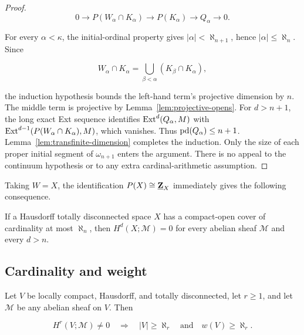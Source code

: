 \begin{proof}
\[
0\longrightarrow P(W_\alpha\cap K_\alpha)
\longrightarrow P(K_\alpha)
\longrightarrow Q_\alpha\longrightarrow0.
\]

For every \(\alpha<\kappa\), the initial-ordinal property gives
\(|\alpha|<\aleph_{n+1}\), hence \(|\alpha|\leq\aleph_n\). Since

\[
W_\alpha\cap K_\alpha
=\bigcup_{\beta<\alpha}(K_\beta\cap K_\alpha),
\]

the induction hypothesis bounds the left-hand term's projective dimension
by \(n\). The middle term is projective by
Lemma~\ref{lem:projective-opens}. For \(d>n+1\), the long exact Ext
sequence identifies \(\operatorname{Ext}^d(Q_\alpha,M)\) with
\(\operatorname{Ext}^{d-1}(P(W_\alpha\cap K_\alpha),M)\), which vanishes.
Thus \(\operatorname{pd}(Q_\alpha)\leq n+1\).
Lemma~\ref{lem:transfinite-dimension} completes the induction.
Only the size of each proper initial segment of \(\omega_{n+1}\) enters
the argument. There is no appeal to the continuum hypothesis or to any
extra cardinal-arithmetic assumption.
\end{proof}

Taking \(W=X\), the identification \(P(X)\cong\underline{\mathbf Z}_X\)
immediately gives the following consequence.

\begin{corollary}\label{cor:cover-vanishing}
If a Hausdorff totally disconnected space \(X\) has a compact-open cover
of cardinality at most \(\aleph_n\), then
\(H^d(X;\mathcal M)=0\) for every abelian sheaf \(\mathcal M\) and
every \(d>n\).
\end{corollary}

\subsection{Cardinality and weight}

\begin{corollary}\label{cor:universal-minimality}
Let \(V\) be locally compact, Hausdorff, and totally disconnected, let
\(r\geq1\), and let \(\mathcal M\) be any abelian sheaf on \(V\).
Then

\[
H^r(V;\mathcal M)\neq0
\quad\Longrightarrow\quad
|V|\geq\aleph_r
\quad\text{and}\quad
w(V)\geq\aleph_r.
\]

\end{corollary}

